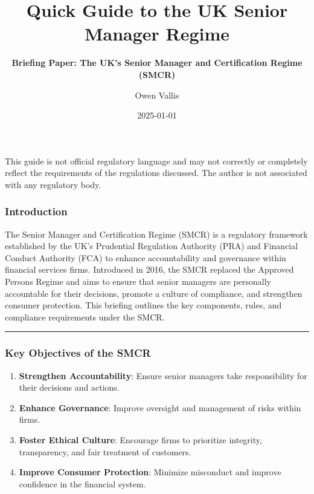 \documentclass[
  a4paper,
]{article}
\title{Quick Guide to the UK Senior Manager Regime}
\subtitle{\textbf{Briefing Paper: The UK's Senior Manager and
Certification Regime (SMCR)}}
\author{Owen Vallis}
\date{2025-01-01}
\providecommand{\tightlist}{%
  \setlength{\itemsep}{0pt}\setlength{\parskip}{0pt}}\usepackage{longtable,booktabs,array}
\renewcommand*\contentsname{Table of contents}
\newcommand\contentsname{Table of contents}
\begin{document}
\maketitle

\renewcommand*\contentsname{Contents}
{
\hypersetup{linkcolor=}
\setcounter{tocdepth}{2}
\tableofcontents
}

\begin{tcolorbox}[enhanced jigsaw, breakable, title=\textcolor{quarto-callout-warning-color}{\faExclamationTriangle}\hspace{0.5em}{WARNING - Disclaimer}, toprule=.15mm, left=2mm, leftrule=.75mm, opacityback=0, arc=.35mm, bottomtitle=1mm, colback=white, coltitle=black, rightrule=.15mm, colbacktitle=quarto-callout-warning-color!10!white, colframe=quarto-callout-warning-color-frame, titlerule=0mm, toptitle=1mm, bottomrule=.15mm, opacitybacktitle=0.6]

This guide is not official regulatory language and may not correctly or
completely reflect the requirements of the regulations discussed. The
author is not associated with any regulatory body.

\end{tcolorbox}

\subsubsection{Introduction}\label{introduction}

The Senior Manager and Certification Regime (SMCR) is a regulatory
framework established by the UK's Prudential Regulation Authority (PRA)
and Financial Conduct Authority (FCA) to enhance accountability and
governance within financial services firms. Introduced in 2016, the SMCR
replaced the Approved Persons Regime and aims to ensure that senior
managers are personally accountable for their decisions, promote a
culture of compliance, and strengthen consumer protection. This briefing
outlines the key components, rules, and compliance requirements under
the SMCR.

\begin{center}\rule{0.5\linewidth}{0.5pt}\end{center}

\subsubsection{Key Objectives of the
SMCR}\label{key-objectives-of-the-smcr}

\begin{enumerate}
\def\labelenumi{\arabic{enumi}.}
\tightlist
\item
  \textbf{Strengthen Accountability}: Ensure senior managers take
  responsibility for their decisions and actions.
\item
  \textbf{Enhance Governance}: Improve oversight and management of risks
  within firms.
\item
  \textbf{Foster Ethical Culture}: Encourage firms to prioritize
  integrity, transparency, and fair treatment of customers.
\item
  \textbf{Improve Consumer Protection}: Minimize misconduct and improve
  confidence in the financial system.
\end{enumerate}
\end{document}
